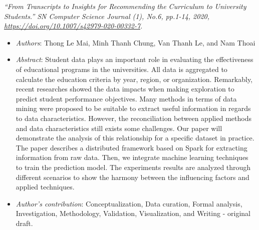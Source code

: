 \textit{``From Transcripts to Insights for Recommending the Curriculum to University Students.'' SN Computer Science Journal (1), No.6, pp.1-14, 2020, \url{https://doi.org/10.1007/s42979-020-00332-7}.}
\begin{itemize}
	\item \textit{Authors}: Thong Le Mai, Minh Thanh Chung, Van Thanh Le, and Nam Thoai
	\item \textit{Abstract}: Student data plays an important role in evaluating the effectiveness of educational programs in the universities. All data is aggregated to calculate the education criteria by year, region, or organization. Remarkably, recent researches showed the data impacts when making exploration to predict student performance objectives. Many methods in terms of data mining were proposed to be suitable to extract useful information in regards to data characteristics. However, the reconciliation between applied methods and data characteristics still exists some challenges. Our paper will demonstrate the analysis of this relationship for a specific dataset in practice. The paper describes a distributed framework based on Spark for extracting information from raw data. Then, we integrate machine learning techniques to train the prediction model. The experiments results are analyzed through different scenarios to show the harmony between the influencing factors and applied techniques.
	\item \textit{Author's contribution}: Conceptualization, Data curation, Formal analysis, Investigation, Methodology, Validation, Visualization, and Writing - original draft.
\end{itemize}

\newpage
